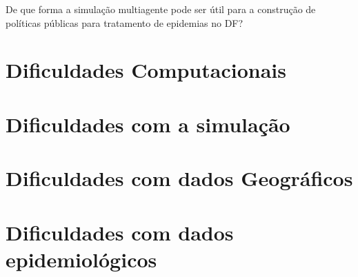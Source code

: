 
De que forma a simulação multiagente pode ser útil para a construção de políticas públicas para tratamento de epidemias no DF?

\section{Dificuldades Computacionais}
\section{Dificuldades com a  simulação}
\section{Dificuldades com dados Geográficos}
\section{Dificuldades com dados epidemiológicos}


